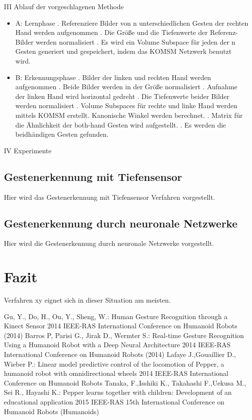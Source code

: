 \documentclass{llncs}
\begin{document}
III Ablauf der vorgeschlagenen Methode
\begin{itemize}
\item A: Lernphase
. Referenziere Bilder von n unterschiedlichen Gesten der rechten Hand werden aufgenommen
. Die Größe und die Tiefenwerte der Referenz-Bilder werden normalisiert
. Es wird ein Volume Subspace für jeden der n Gesten generiert und gespeichert, indem das KOMSM Netzwerk benutzt wird. 
\item B: Erkennungsphase
. Bilder der linken und rechten Hand werden aufgenommen
. Beide Bilder werden in der Größe normalisiert
. Aufnahme der linken Hand wird horizontal gedreht
. Die Tiefenwerte beider Bilder werden normalisiert
. Volume Subspaces für rechte und linke Hand werden mittels KOMSM erstellt. Kanonische Winkel werden berechnet. 
. Matrix für die Ähnlichkeit der both-hand Gesten wird aufgestellt.
. Es werden die beidhändigen Gesten gefunden. 
\end{itemize}
IV Experimente
\subsection{Gestenerkennung mit Tiefensensor}
Hier wird das Gestenerkennung mit Tiefensensor Verfahren vorgestellt.
\subsection{Gestenerkennung durch neuronale Netzwerke}
Hier wird die Gestenerkennung durch neuronale Netzwerke vorgestellt.
\section{Fazit}
Verfahren xy eignet sich in dieser Situation am meisten.
\newpage
\begin{thebibliography}{[MT1]}
Gu, Y., Do, H., Ou, Y., Sheng, W.:
Human Gesture Recognition through a Kinect Sensor
2014 IEEE-RAS International Conference on Humanoid Robots (2014)
Barros P, Parisi G., Jirak D., Wermter S.:
Real-time Gesture Recognition Using a Humanoid Robot with a Deep Neural Architecture 2014 IEEE-RAS International Conference on Humanoid Robots (2014)
Lafaye J.,Gouaillier D., Wieber P.:
Linear model predictive control of the locomotion of Pepper, a humanoid robot with omnidirectional wheels 2014 IEEE-RAS International Conference on Humanoid Robots
Tanaka, F.,Isshiki K., Takahashi F.,Uekusa M., Sei R., Hayashi K.:
Pepper learns together with children: Development of an educational application 2015 IEEE-RAS 15th International Conference on Humanoid Robots (Humanoids)
\end{thebibliography}
\end{document}
